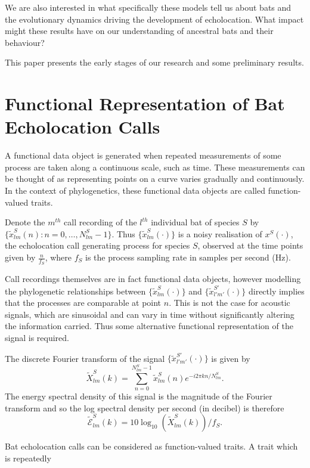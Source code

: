 \documentclass[wsdraft]{ws-rv9x6} %
\begin{document}
We are also interested in what specifically these models tell us about bats and the evolutionary dynamics driving the development of echolocation. What impact might these results have on our understanding of ancestral bats and their behaviour?

This paper presents the early stages of our research and some preliminary results.

\section{Functional Representation of Bat Echolocation Calls}

A functional data object is generated when repeated measurements of some process are taken along a continuous scale, such as time. \cite{ramsay2006functional} These measurements can be thought of as representing points on a curve varies gradually and continuously. In the context of phylogenetics, these functional data objects are called function-valued traits. \cite{meyer2005up}

Denote the \(m^{th}\) call recording of the \(l^{th}\) individual bat of species \(S\) by \(\{\tilde{x}_{lm}^S(n) : n = 0, \dots, N_{lm}^S - 1\}\). Thus \(\{\tilde{x}_{lm}^S(\cdot)\}\) is a noisy realisation of \(x^S(\cdot)\), the echolocation call generating process for species \(S\), observed at the time points given by \(\frac{n}{f_S}\), where \(f_S\) is the process sampling rate in samples per second (Hz).

Call recordings themselves are in fact functional data objects, however modelling the phylogenetic relationships between \(\{\tilde{x}_{lm}^S(\cdot)\}\) and \(\{\tilde{x}_{l'm'}^{S'}(\cdot)\}\) directly implies that the processes are comparable at point \(n\). This is not the case for acoustic signals, which are sinusoidal and can vary in time without significantly altering the information carried. Thus some alternative functional representation of the signal is required.

The discrete Fourier transform of the signal \(\{\tilde{x}_{l'm'}^{S'}(\cdot)\}\) is given by\[\tilde{X}_{lm}^S(k) = \sum_{n = 0}^{N_{lm}^S - 1} \tilde{x}_{lm}^{S}(n) e^{-i2\pi kn / N_{lm}^S }.\] The energy spectral density of this signal is the magnitude of the Fourier transform and so the log spectral density per second (in decibel) is therefore \[\tilde{\mathcal{E}}_{lm}^S(k) = 10 \log_{10} \left(\tilde{X}_{lm}^S(k)\right) / f_S.\]


Bat echolocation calls can be considered as function-valued traits. A trait which is repeatedly 




\end{document}
